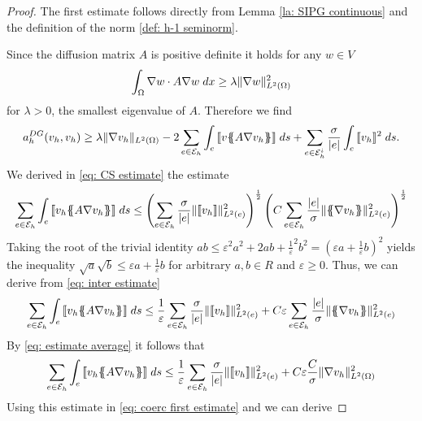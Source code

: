 \begin{proof}
	The first estimate follows directly from Lemma \ref{la: SIPG continuous} and the definition of the norm \ref{def: h-1 seminorm}. 
		
	Since the diffusion matrix $A$ is positive definite it holds for any $w \in V$
	\begin{align}
	\int_{\Omega} {{\nabla w \cdot A \nabla w}\;dx} \geq \lambda \lVert \nabla w  \rVert_{L^2(\Omega)}^2  \label{eq: estimate pos def}
	\end{align}
	for $\lambda >0$, the smallest eigenvalue of $A$.
	Therefore we find
	\begin{align}
	a_h^{DG}(v_h,v_h) \geq \lambda \lVert \nabla v_h \rVert_{L^2(\Omega)} - 2 \sum\limits_{e \in \mathcal{E}_h}\int_{e} {{ \llbracket v \{\!\!\{ A \nabla v_h \}\!\!\}  \rrbracket}\;ds} + \sum_{e\in \mathcal{E}_h^i} \frac \sigma {|e|} \int_{e} {{\llbracket v_h \rrbracket^2}\;ds} .\label{eq: coerc first estimate}
	\end{align}
	We derived in \eqref{eq: CS estimate} the estimate 
	\begin{align}
	\sum\limits_{e \in \edges}\myIntS e { \jump {v_h \average{A \nabla v_h} }}
	\leq		\left( \sum\limits_{e \in \edges} \frac {\sigma}{|e|} \LTwonormE{\jump {v_h}}^2 \right)^{\frac 1 2}
	\left(C \sum\limits_{e \in \edges} \frac {|e|} \sigma \LTwonormE{\average{\nabla v_h}}^2 \right)^{\frac 1 2} \label{eq: inter estimate}
	\end{align}
	Taking the root of the trivial identity $ab \leq \varepsilon^2 a^2 + 2ab + {\frac 1 \varepsilon}^2b^2 = \left( \varepsilon a + \frac 1 \varepsilon b\right)^2$ yields the inequality $\sqrt{a} \sqrt{b} \leq \varepsilon a + \frac 1 \varepsilon b$ for arbitrary $a,b \in R$ and $\varepsilon \geq 0$. Thus, we can derive from \eqref{eq: inter estimate}
	\begin{align*}
	\sum\limits_{e \in \edges}\myIntS e { \jump {v_h \average{A \nabla v_h} }} 
	\leq \frac 1 \varepsilon \sum\limits_{e \in \edges}\frac \sigma {|e|}\LTwonormE{\jump {v_h}}^2 
	+ C\varepsilon  \sum\limits_{e \in \edges}  \frac {|e|} \sigma \LTwonormE{\average{\nabla v_h}}^2
	\end{align*}
	By \eqref{eq: estimate average} it follows that 
	\begin{align*}
		\sum\limits_{e \in \mathcal{E}_h}\int_{e} {{ \llbracket v_h \{\!\!\{ A \nabla v_h \}\!\!\}  \rrbracket}\;ds} 
		\leq \frac 1 \varepsilon \sum\limits_{e \in \mathcal{E}_h}\frac \sigma {|e|}\lVert \llbracket v_h \rrbracket \rVert_{L^2(e)}^2 
		+ C\varepsilon  \frac C \sigma \lVert \nabla v_h \rVert_{L^2(\Omega)}^2
	\end{align*}			
	Using this estimate in \eqref{eq: coerc first estimate} and we can derive

\end{proof}
